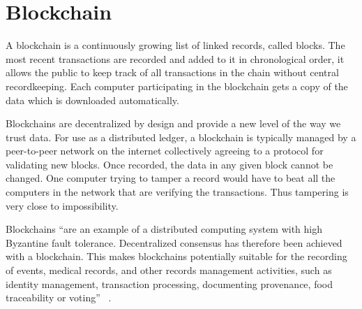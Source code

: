 \section{Blockchain}

A blockchain is a continuously growing list of linked records, called
blocks. The most recent transactions are recorded and added to it in
chronological order, it allows the public to keep track of all
transactions in the chain without central recordkeeping. Each computer
participating in the blockchain gets a copy of the data which is
downloaded automatically.

Blockchains are decentralized by design and provide a new level of the
way we trust data. For use as a distributed ledger, a blockchain is
typically managed by a peer-to-peer network on the internet
collectively agreeing to a protocol for validating new blocks. Once
recorded, the data in any given block cannot be changed. One computer
trying to tamper a record would have to beat all the computers in the
network that are verifying the transactions. Thus tampering is very
close to impossibility.

Blockchains ``are an example of a distributed computing system with
high Byzantine fault tolerance. Decentralized consensus has therefore
been achieved with a blockchain. This makes blockchains potentially
suitable for the recording of events, medical records, and other
records management activities, such as identity management,
transaction processing, documenting provenance, food traceability or
voting'' ~\cite{hid-sp18-506-Blockchain}.
